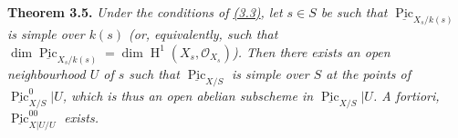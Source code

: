 \documentclass{article}
\newenvironment{itenv}[1]
  {\phantomsection\par\smallskip\noindent\textbf{#1.}\itshape}
  {\par\smallskip}
\theoremstyle{definition}
\theoremstyle{definition}
\theoremstyle{definition}
\theoremstyle{definition}
\theoremstyle{remark}
\begin{document}
\leavevmode{}%
\begin{itenv}{Theorem 3.5}
Under the conditions of \protect\hyperlink{fga-3-vi-theorem-3.3}{(3.3)}, let \(s\in S\) be such that \(\underline{\operatorname{Pic}}_{X_s/k(s)}\) is simple over \(k(s)\) (or, equivalently, such that \(\dim\underline{\operatorname{Pic}}_{X_s/k(s)}=\dim\operatorname{H}^1(X_s,{\mathscr{O}}_{X_s})\)).
Then there exists an open neighbourhood \(U\) of \(s\) such that \(\underline{\operatorname{Pic}}_{X/S}\) is simple over \(S\) at the points of \(\underline{\operatorname{Pic}}_{X/S}^0|U\), which is thus an open abelian subscheme in \(\underline{\operatorname{Pic}}_{X/S}|U\).
A fortiori, \(\underline{\operatorname{Pic}}_{X|U/U}^{00}\) exists.

\end{itenv}
\end{document}
